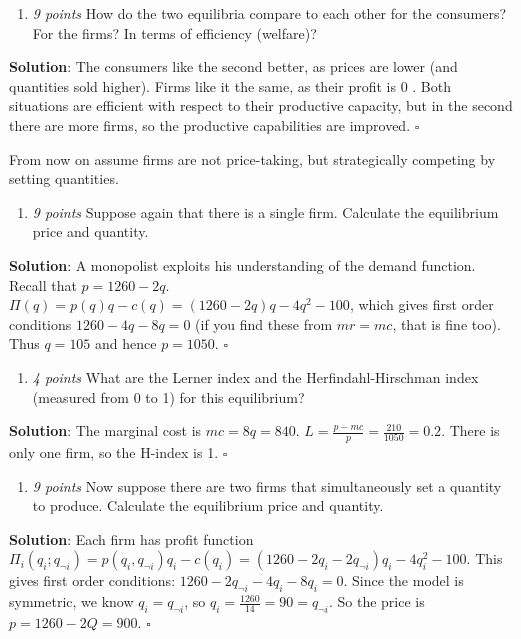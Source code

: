 \documentclass{article}
\begin{document}
\begin{enumerate}[resume*]
  \item \textit{9 points }How do the two equilibria compare to each other for the consumers? For the firms? In terms of efficiency (welfare)?\end{enumerate}
\textbf{Solution}:
The consumers like the second better, as prices are lower (and quantities sold higher). Firms like it the same, as their profit is 0 . Both situations are efficient with respect to their productive capacity, but in the second there are more firms, so the productive capabilities are improved. $\square$


From now on assume firms are not price-taking, but strategically competing by setting quantities.

\begin{enumerate}[resume*]
\item \textit{9 points }Suppose again that there is a single firm. Calculate the equilibrium price and quantity.\end{enumerate}
\textbf{Solution}:
A monopolist exploits his understanding of the demand function. Recall that $p=1260-2q$.
$\Pi(q)=p(q)q-c(q)=(1260-2q)q-4q^{2}-100$, which gives first order conditions $1260-4q-8q=0$ (if you find these from $mr=mc$, that is fine too). Thus $q=105$ and hence $p=1050$. $\square$

\begin{enumerate}[resume*]
\item \textit{4 points }What are the Lerner index and the Herfindahl-Hirschman index (measured from 0 to 1) for this equilibrium?\end{enumerate}
\textbf{Solution}:
The marginal cost is $mc=8q=840$. $L=\frac{p-mc}p=\frac{210}{1050}=0.2$. There is only one firm, so the H-index is 1. $\square$

\begin{enumerate}[resume*]
\item \textit{9 points }Now suppose there are two firms that simultaneously set a quantity to produce. Calculate the equilibrium price and quantity.\end{enumerate}
\textbf{Solution}:
Each firm has profit function $\Pi_{i}(q_{i};q_{\neg i})=p(q_{i},q_{\neg i})q_{i}-c(q_{i})=(1260-2q_{i}-2q_{\neg i})q_{i}-4q_{i}^{2}-100$. This gives first order conditions: $1260-2q_{\neg i}-4q_{i}-8q_{i}=0$. Since the model is symmetric, we know $q_{i}=q_{\neg i}$, so $q_{i}=\frac{1260}{14}=90=q_{\neg i}$. So the price is $p=1260-2Q=900$. $\square$
\end{document}
